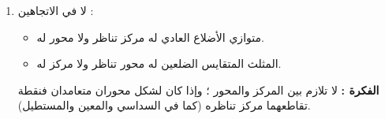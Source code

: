 \documentclass[12pt,a4paper]{article}
\begin{document}
\begin{corr}[title={مراكز التناظر ومحاوره}, stars=3, source={Axiomaths}]
\begin{enumerate}[itemsep=14pt]
  \item لا في الاتجاهين :
  \begin{itemize}
    \item متوازي الأضلاع العادي له مركز تناظر ولا محور له.
    \item المثلث المتقايس الضلعين له محور تناظر ولا مركز له.
  \end{itemize}
  \textbf{الفكرة :} لا تلازم بين المركز والمحور ؛ وإذا كان لشكل محوران متعامدان فنقطة تقاطعهما مركز تناظره (كما في السداسي والمعين والمستطيل).
\end{enumerate}
\end{corr}
\end{document}
